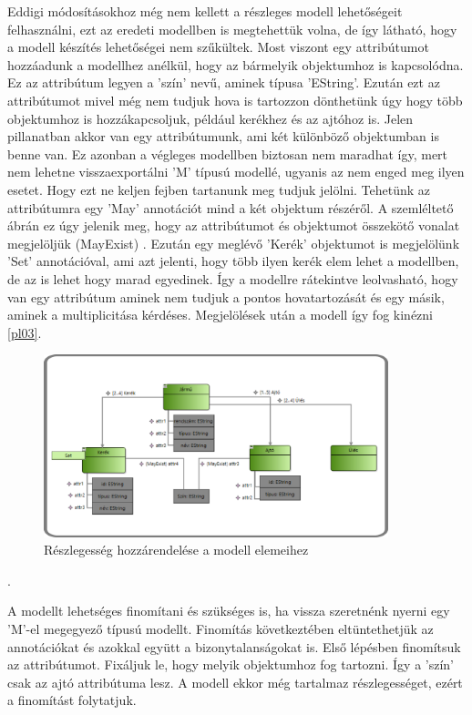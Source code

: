\par
Eddigi módosításokhoz még nem kellett a részleges modell lehetőségeit felhasználni, ezt az eredeti modellben is megtehettük volna, de így látható, hogy a modell készítés lehetőségei nem szűkültek. Most viszont egy attribútumot hozzáadunk a modellhez anélkül, hogy az bármelyik objektumhoz is kapcsolódna. Ez az attribútum legyen a 'szín' nevű, aminek típusa 'EString'. Ezután ezt az attribútumot mivel még nem tudjuk  hova is tartozzon dönthetünk úgy hogy több objektumhoz is hozzákapcsoljuk, például kerékhez és az ajtóhoz is.
Jelen pillanatban akkor van egy attribútumunk, ami két különböző objektumban is benne van. Ez azonban a végleges modellben biztosan nem maradhat így, mert nem lehetne visszaexportálni 'M' típusú modellé, ugyanis az nem enged meg ilyen esetet. Hogy ezt ne keljen fejben tartanunk meg tudjuk jelölni. Tehetünk az attribútumra egy 'May' annotációt mind a két objektum részéről. A szemléltető ábrán ez úgy jelenik meg, hogy az attribútumot és objektumot összekötő vonalat megjelöljük (MayExist) . Ezután egy meglévő 'Kerék' objektumot is megjelölünk 'Set' annotációval, ami azt jelenti, hogy több ilyen kerék elem lehet a modellben, de az is lehet hogy marad egyedinek. Így a modellre rátekintve leolvasható, hogy van egy attribútum aminek nem tudjuk a pontos hovatartozását és egy másik, aminek a multiplicitása kérdéses. Megjelölések után a modell így fog kinézni \autoref{pl03}.
\begin{figure}[!ht]
	\centering
	\includegraphics[width=100mm]{figures/pl03.pdf}
	\caption{Részlegesség hozzárendelése a modell elemeihez} 
	\label{pl03}
\end{figure}.
\par
A modellt lehetséges finomítani és szükséges is, ha vissza szeretnénk nyerni egy 'M'-el megegyező típusú modellt. Finomítás következtében eltüntethetjük az annotációkat és azokkal együtt a bizonytalanságokat is. Első lépésben finomítsuk az attribútumot. Fixáljuk le, hogy melyik objektumhoz fog tartozni. Így a 'szín' csak az ajtó attribútuma lesz. A modell ekkor még tartalmaz részlegességet, ezért a finomítást folytatjuk.

